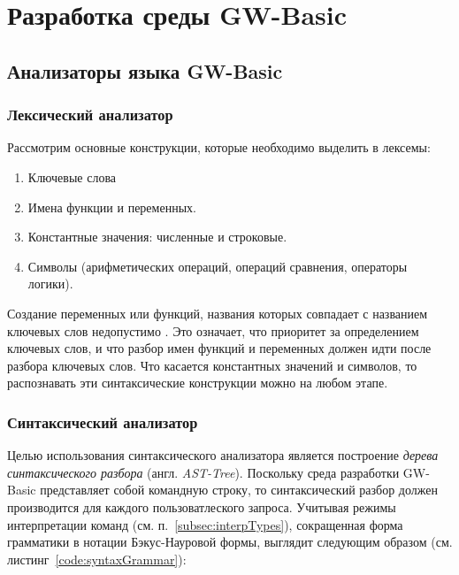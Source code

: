 \documentclass[12pt]{article}
\begin{document}
	\newpage
	\section{Разработка среды GW-Basic}
		\subsection{Анализаторы языка GW-Basic}
			\subsubsection{Лексический анализатор}
			\label{subsec:lexAnalyzer}
				\hspace{\parindent} Рассмотрим основные конструкции, которые необходимо выделить в лексемы:
				\begin{enumerate}
					\item Ключевые слова
					\item Имена функции и переменных.
					\item Константные значения: численные и строковые.
					\item Символы (арифметических операций, операций сравнения, операторы логики).
				\end{enumerate}
				
				\indent Создание переменных или функций, названия которых совпадает с названием ключевых слов недопустимо \cite{basicManual}. Это означает, что приоритет за определением ключевых слов, и что разбор имен функций и переменных должен идти после разбора ключевых слов. Что касается константных значений и символов, то распознавать эти синтаксические конструкции можно на любом этапе.
			\subsubsection{Синтаксический анализатор}
			\label{subsec:syntaxAnalyzer}
				\hspace{\parindent} Целью использования синтаксического анализатора является построение {\it дерева синтаксического разбора} (англ. {\it AST-Tree}). Поскольку среда разработки GW-Basic представляет собой командную строку, то синтаксический разбор должен производится для каждого пользоватлеского запроса. Учитывая режимы интерпретации команд (см. п.~\ref{subsec:interpTypes}), сокращенная форма грамматики в нотации Бэкус-Науровой формы, выглядит следующим образом (см. листинг~\ref{code:syntaxGrammar}):
				
				
\end{document}
